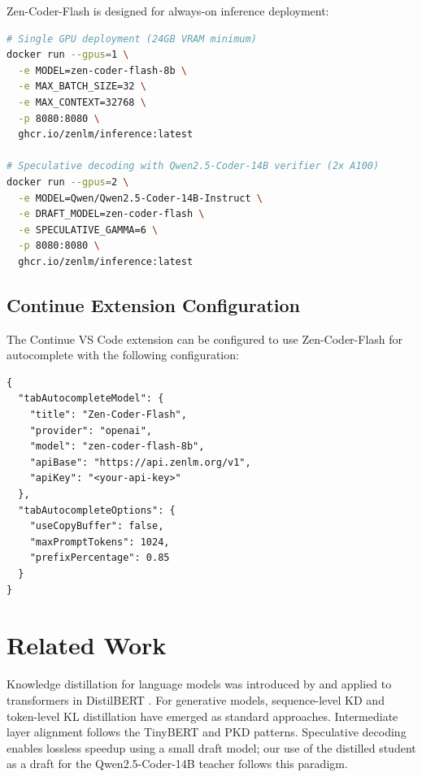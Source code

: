 \documentclass[11pt,a4paper]{article}
\begin{document}
Zen-Coder-Flash is designed for always-on inference deployment:

\begin{lstlisting}[language=bash, caption={Starting a Zen-Coder-Flash inference server.}]
# Single GPU deployment (24GB VRAM minimum)
docker run --gpus=1 \
  -e MODEL=zen-coder-flash-8b \
  -e MAX_BATCH_SIZE=32 \
  -e MAX_CONTEXT=32768 \
  -p 8080:8080 \
  ghcr.io/zenlm/inference:latest

# Speculative decoding with Qwen2.5-Coder-14B verifier (2x A100)
docker run --gpus=2 \
  -e MODEL=Qwen/Qwen2.5-Coder-14B-Instruct \
  -e DRAFT_MODEL=zen-coder-flash \
  -e SPECULATIVE_GAMMA=6 \
  -p 8080:8080 \
  ghcr.io/zenlm/inference:latest
\end{lstlisting}

\subsection{Continue Extension Configuration}

The Continue VS Code extension can be configured to use Zen-Coder-Flash for autocomplete
with the following configuration:

\begin{lstlisting}[language={},caption={Continue config.json for Zen-Coder-Flash.}]
{
  "tabAutocompleteModel": {
    "title": "Zen-Coder-Flash",
    "provider": "openai",
    "model": "zen-coder-flash-8b",
    "apiBase": "https://api.zenlm.org/v1",
    "apiKey": "<your-api-key>"
  },
  "tabAutocompleteOptions": {
    "useCopyBuffer": false,
    "maxPromptTokens": 1024,
    "prefixPercentage": 0.85
  }
}
\end{lstlisting}

\section{Related Work}

Knowledge distillation for language models was introduced by \cite{hinton2015distilling}
and applied to transformers in DistilBERT \cite{sanh2019distilbert}. For generative models,
sequence-level KD \cite{kim2016seq} and token-level KL distillation \cite{gu2024minillm}
have emerged as standard approaches. Intermediate layer alignment follows the TinyBERT
\cite{jiao2020tinybert} and PKD \cite{sun2019patient} patterns. Speculative decoding
\cite{leviathan2023speculative, chen2023accelerating} enables lossless speedup using a small
draft model; our use of the distilled student as a draft for the Qwen2.5-Coder-14B teacher
\cite{qwen25coder} follows this paradigm.
\end{document}
